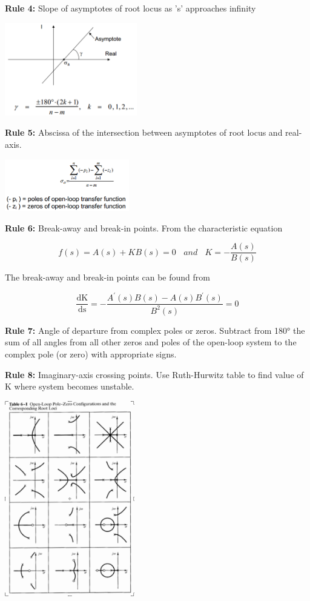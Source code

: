 \documentclass[a0,landscape]{article}
\begin{document}
\begin{multicols}{3}
\textbf{Rule 4:} Slope of asymptotes of root locus as 's' approaches
infinity

\includegraphics[width=2.27580in,height=1.59509in]{media/image17.png}

\textbf{Rule 5:} Abscissa of the intersection between asymptotes of root
locus and real-axis.

\includegraphics[width=2.13497in,height=0.89069in]{media/image18.png}

\textbf{Rule 6:} Break-away and break-in points. From the characteristic
equation

\[f\left( s \right) = A\left( s \right) + KB\left( s \right) = 0\ \ \ \ and\ \ \ \ K = - \frac{A\left( s \right)}{B\left( s \right)}\]

The break-away and break-in points can be found from

\[\frac{\text{dK}}{\text{ds}} = - \frac{A^{'}\left( s \right)B\left( s \right) - A\left( s \right)B^{'}\left( s \right)}{B^{2}\left( s \right)} = 0\]

\textbf{Rule 7:} Angle of departure from complex poles or zeros.
Subtract from 180° the sum of all angles from all other zeros and poles
of the open-loop system to the complex pole (or zero) with appropriate
signs.

\textbf{Rule 8:} Imaginary-axis crossing points. Use Ruth-Hurwitz table
to find value of K where system becomes unstable.

\includegraphics[width=2.22564in,height=3.36063in]{media/image19.png}


\end{multicols}
\end{document}
